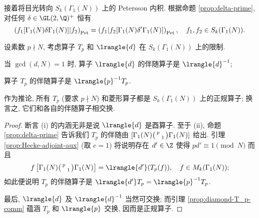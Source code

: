 接着将目光转向 $S_k(\Gamma_1(N))$ 上的 Petersson 内积. 根据命题 \ref{prop:delta-prime}, 对任何 $\delta \in \GL(2,\Q)^+$ 恒有
\[ \left( f_1 [\Gamma_1(N) \delta \Gamma_1(N)] \middle| f_2 \right)_{\mathrm{Pet}} = \left( f_1 \middle| f_2 [\Gamma_1(N) \delta' \Gamma_1(N) ] \right)_{\mathrm{Pet}}, \quad f_1, f_2 \in S_k(\Gamma_1(N)). \]

\begin{theorem}\label{prop:Hecke-adjoint-0}
	设素数 $p \nmid N$, 考虑算子 $T_p$ 和 $\lrangle{d}$ 在 $S_k(\Gamma_1(N))$ 上的限制.
	\begin{compactenum}[(i)]
		\item 当 $\gcd(d,N)=1$ 时, 算子 $\lrangle{d}$ 的伴随算子是 $\lrangle{d}^{-1}$;
		\item 算子 $T_p$ 的伴随算子是 $\lrangle{p}^{-1} T_p$.
	\end{compactenum}
	作为推论, 所有 $T_p$ (要求 $p \nmid N$) 和菱形算子都是 $S_k(\Gamma_1(N))$ 上的正规算子; 换言之, 它们和各自的伴随算子相交换.
\end{theorem}
\begin{proof}
	断言 (i) 的内涵无非是说 $\lrangle{d}$ 是酉算子. 至于 (ii), 命题 \ref{prop:delta-prime} 告诉我们 $T_p$ 的伴随由 $[\Gamma_1(N) \bigl(\begin{smallmatrix} p &  \\  & 1 \end{smallmatrix}\bigr) \Gamma_1(N)]$ 给出. 引理 \ref{prop:Hecke-adjoint-aux} (取 $e=1$) 将说明存在 $d' \in \Z$ 使得 $pd' \equiv 1 \pmod N$ 而且
	\[ f \left[\Gamma_1(N) \twomatrix{p}{}{}{1} \Gamma_1(N)\right] = \lrangle{d'}(T_p(f)), \quad f \in M_k(\Gamma_1(N)); \]
	如此便说明 $T_p$ 的伴随算子是 $\lrangle{d'} T_p = \lrangle{p}^{-1} T_p$.
	
	最后, $\lrangle{d}$ 及 $\lrangle{d}^{-1}$ 当然可交换; 而引理 \ref{prop:diamond-T_p-comm} 蕴涵 $T_p$ 和 $\lrangle{p}$ 交换, 因而是正规算子.
\end{proof}

